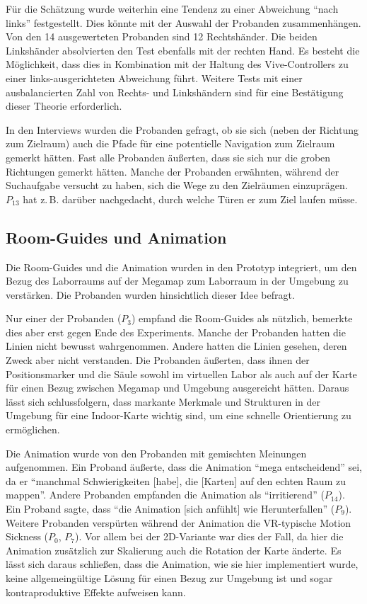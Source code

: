 Für die Schätzung wurde weiterhin eine Tendenz zu einer Abweichung \enquote{nach links} festgestellt.
Dies könnte mit der Auswahl der Probanden zusammenhängen.
Von den 14 ausgewerteten Probanden sind 12 Rechtshänder.
Die beiden Linkshänder absolvierten den Test ebenfalls mit der rechten Hand.
Es besteht die Möglichkeit, dass dies in Kombination mit der Haltung des Vive-Controllers zu einer links-ausgerichteten Abweichung führt.
Weitere Tests mit einer ausbalancierten Zahl von Rechts- und Linkshändern sind für eine Bestätigung dieser Theorie erforderlich.

In den Interviews wurden die Probanden gefragt, ob sie sich (neben der Richtung zum Zielraum) auch die Pfade für eine potentielle Navigation zum Zielraum gemerkt hätten.
Fast alle Probanden äußerten, dass sie sich nur die groben Richtungen gemerkt hätten.
Manche der Probanden erwähnten, während der Suchaufgabe versucht zu haben, sich die Wege zu den Zielräumen einzuprägen.
$P_{13}$ hat z.\,B. darüber nachgedacht, durch welche Türen er zum Ziel laufen müsse.

\subsection{Room-Guides und Animation}
Die Room-Guides und die Animation wurden in den Prototyp integriert, um den Bezug des Laborraums auf der Megamap zum Laborraum in der Umgebung zu verstärken.
Die Probanden wurden hinsichtlich dieser Idee befragt.

Nur einer der Probanden ($P_3$) empfand die Room-Guides als nützlich, bemerkte dies aber erst gegen Ende des Experiments.
Manche der Probanden hatten die Linien nicht bewusst wahrgenommen.
Andere hatten die Linien gesehen, deren Zweck aber nicht verstanden.
Die Probanden äußerten, dass ihnen der Positionsmarker und die Säule sowohl im virtuellen Labor als auch auf der Karte für einen Bezug zwischen Megamap und Umgebung ausgereicht hätten.
Daraus lässt sich schlussfolgern, dass markante Merkmale und Strukturen in der Umgebung für eine Indoor-Karte wichtig sind, um eine schnelle Orientierung zu ermöglichen.

Die Animation wurde von den Probanden mit gemischten Meinungen aufgenommen.
Ein Proband äußerte, dass die Animation \enquote{mega entscheidend} sei, da er \enquote{manchmal Schwierigkeiten [habe], die [Karten] auf den echten Raum zu mappen}.
Andere Probanden empfanden die Animation als \enquote{irritierend} ($P_{14}$).
Ein Proband sagte, dass \enquote{die Animation [sich anfühlt] wie Herunterfallen} ($P_9$).
Weitere Probanden verspürten während der Animation die VR-typische Motion Sickness ($P_0$, $P_7$).
Vor allem bei der 2D-Variante war dies der Fall, da hier die Animation zusätzlich zur Skalierung auch die Rotation der Karte änderte.
Es lässt sich daraus schließen, dass die Animation, wie sie hier implementiert wurde, keine allgemeingültige Lösung für einen Bezug zur Umgebung ist und sogar kontraproduktive Effekte aufweisen kann.

